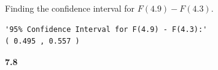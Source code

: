 \medskip\noindent
Finding the confidence interval for $F(4.9) - F(4.3)$.

\begin{lstlisting}[style=RSyntax, title=R]
'95% Confidence Interval for F(4.9) - F(4.3):'
( 0.495 , 0.557 )
\end{lstlisting}

\bigskip\noindent
\textbf{7.8}\\  %

